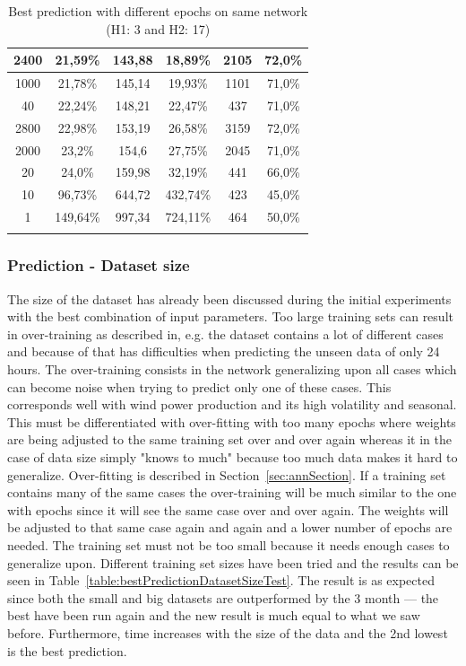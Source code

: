 \begin{center}
\begin{longtable}{|c|c|c|c|c|c|}
2400 & 21,59\% & 143,88 & 18,89\% & 2105 & 72,0\% \\ \hline
1000 & 21,78\% & 145,14 & 19,93\% & 1101 & 71,0\% \\ \hline
40 & 22,24\% & 148,21 & 22,47\% & 437 & 71,0\% \\ \hline
2800 & 22,98\% & 153,19 & 26,58\% & 3159 & 72,0\% \\ \hline
2000 & 23,2\% & 154,6 & 27,75\% & 2045 & 71,0\% \\ \hline
20 & 24,0\% & 159,98 & 32,19\% & 441 & 66,0\% \\ \hline
10 & 96,73\% & 644,72 & 432,74\% & 423 & 45,0\% \\ \hline
1 & 149,64\% & 997,34 & 724,11\% & 464 & 50,0\% \\ \hline
\caption{Best prediction with different epochs on same network (H1: 3 and H2: 17)}
\label{table:bestPredictionEpochExperiment}
\end{longtable}
\end{center}

\subsubsection{Prediction - Dataset size}
The size of the dataset has already been discussed during the initial experiments with the best combination of input parameters. Too large training sets can result in over-training as described in\cite{1}, e.g. the dataset contains a lot of different cases and because of that has difficulties when predicting the unseen data of only 24 hours. The over-training consists in the network generalizing upon all cases which can become noise when trying to predict only one of these cases. This corresponds well with wind power production and its high volatility and seasonal. This must be differentiated with over-fitting with too many epochs where weights are being adjusted to the same training set over and over again whereas it in the case of data size simply "knows to much" because too much data makes it hard to generalize. Over-fitting is described in Section~\ref{sec:annSection}. If a training set contains many of the same cases the over-training will be much similar to the one with epochs since it will see the same case over and over again. The weights will be adjusted to that same case again and again and a lower number of epochs are needed. The training set must not be too small because it needs enough cases to generalize upon. Different training set sizes have been tried and the results can be seen in Table~\ref{table:bestPredictionDatasetSizeTest}. The result is as expected since both the small and big datasets are outperformed by the 3 month --- the best have been run again and the new result is much equal to what we saw before. Furthermore, time increases with the size of the data and the 2nd lowest is the best prediction.

